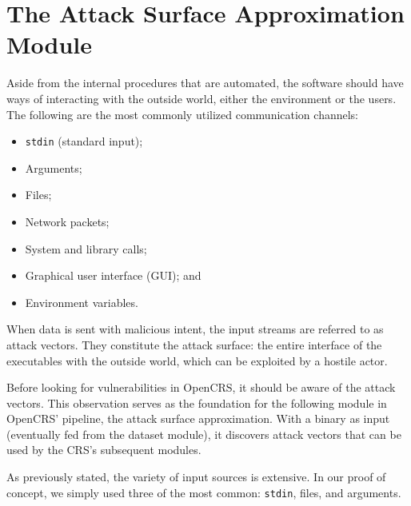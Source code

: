 \documentclass[../main.tex]{subfiles}
\begin{document}
\hypertarget{attack-surface-approximation-module}{%
  \chapter{The Attack Surface Approximation
    Module}\label{attack-surface-approximation-module}}

Aside from the internal procedures that are automated, the software should have
ways of interacting with the outside world, either the environment or the
users. The following are the most commonly utilized communication channels:

\begin{itemize}
  \tightlist
  \item
        \texttt{stdin} (standard input);
  \item
        Arguments;
  \item
        Files;
  \item
        Network packets;
  \item
        System and library calls;
  \item
        Graphical user interface (GUI); and
  \item
        Environment variables.
\end{itemize}

When data is sent with malicious intent, the input streams are referred to as
attack vectors. They constitute the attack surface: the entire interface of the
executables with the outside world, which can be exploited by a hostile actor.

Before looking for vulnerabilities in OpenCRS, it should be aware of the attack
vectors. This observation serves as the foundation for the following module
\cite{surface_module_repo} in OpenCRS' pipeline, the attack surface
approximation. With a binary as input (eventually fed from the dataset module),
it discovers attack vectors that can be used by the CRS's subsequent modules.

As previously stated, the variety of input sources is extensive. In our proof
of concept, we simply used three of the most common: \texttt{stdin}, files, and
arguments.
\end{document}
